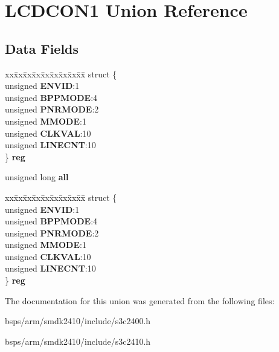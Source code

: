 \hypertarget{unionLCDCON1}{}\section{L\+C\+D\+C\+O\+N1 Union Reference}
\label{unionLCDCON1}
\subsection*{Data Fields}
\begin{DoxyCompactItemize}
\item 
\mbox{\label{unionLCDCON1_a1866e9df504450e8f947e4db5f358e62}} 
\begin{tabbing}
xx\=xx\=xx\=xx\=xx\=xx\=xx\=xx\=xx\=\kill
struct \{\\
\>unsigned {\bfseries ENVID}:1\\
\>unsigned {\bfseries BPPMODE}:4\\
\>unsigned {\bfseries PNRMODE}:2\\
\>unsigned {\bfseries MMODE}:1\\
\>unsigned {\bfseries CLKVAL}:10\\
\>unsigned {\bfseries LINECNT}:10\\
\} {\bfseries reg}\\

\end{tabbing}\item 
\mbox{\label{unionLCDCON1_aaa95c0d8e87f8e9b7a308ff7cd119d98}} 
unsigned long {\bfseries all}
\item 
\mbox{\label{unionLCDCON1_a14d749c4fc745c1de4ea258f29f279fe}} 
\begin{tabbing}
xx\=xx\=xx\=xx\=xx\=xx\=xx\=xx\=xx\=\kill
struct \{\\
\>unsigned {\bfseries ENVID}:1\\
\>unsigned {\bfseries BPPMODE}:4\\
\>unsigned {\bfseries PNRMODE}:2\\
\>unsigned {\bfseries MMODE}:1\\
\>unsigned {\bfseries CLKVAL}:10\\
\>unsigned {\bfseries LINECNT}:10\\
\} {\bfseries reg}\\

\end{tabbing}\end{DoxyCompactItemize}


The documentation for this union was generated from the following files\+:\begin{DoxyCompactItemize}
\item 
bsps/arm/smdk2410/include/s3c2400.\+h\item 
bsps/arm/smdk2410/include/s3c2410.\+h\end{DoxyCompactItemize}
